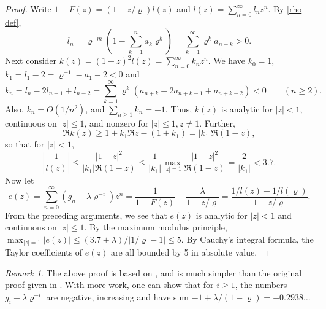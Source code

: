 \documentclass[11pt]{amsart}
\theoremstyle{remark}
\newtheorem{remark}{Remark}
\theoremstyle{plain}
\numberwithin{equation}{section}
\newcommand{\lam}{\ensuremath{\lambda}}
\renewcommand{\(}{\left(}
\renewcommand{\)}{\right)}
\renewcommand{\le}{\leqslant}
\renewcommand{\ge}{\geqslant}
\renewcommand{\rho}{\varrho}
\begin{document}
\begin{proof}
Write $1-F(z)=(1-z/\rho) l(z)$ and $l(z)=\sum_{n=0}^\infty l_n z^n$.
By \eqref{rho def},
\[
l_n=\rho^{-m}\( 1 - \sum_{k=1}^n a_k \rho^k \) =\sum_{k=1}^\infty \rho^k a_{n+k} >0.
\]
Next consider
$k(z)=(1-z)^2 l(z) = \sum_{n=0}^\infty k_n z^n$.  We have $k_0=1$,
$k_1=l_1-2=\rho^{-1}-a_1-2<0$ and
$$
k_n=l_n-2l_{n-1}+l_{n-2} = \sum_{k=1}^\infty \rho^k \( a_{n+k}-2
 a_{n+k-1}+a_{n+k-2} \) < 0 \qquad (n\ge 2).
$$
Also, $k_n=O(1/n^2)$, and $\sum_{n\ge 1} k_n = -1$.  Thus, $k(z)$ is analytic for
$|z|<1$, continuous on $|z| \le 1$, and nonzero for $|z|\le 1, z\ne 1$.
 Further,
$$
\Re k(z) \ge 1 + k_1 \Re z - (1+k_1) = |k_1| \Re (1-z),
$$
so that for $|z|<1$,
$$
\left|\frac{1}{l(z)}\right| \le \frac{|1-z|^2}{|k_1| \Re (1-z)} \le 
\frac{1}{|k_1|} \max_{|z|=1} \frac{|1-z|^2}{\Re (1-z)} = \frac{2}{|k_1|} < 3.7.
$$
Now let 
$$
e(z) = \sum_{n=0}^\infty \( g_n - \lam \rho^{-i} \) z^n = \frac{1}{1-F(z)} - 
\frac{\lam}{1-z/\rho} = \frac{1/l(z)-1/l(\rho)}{1-z/\rho}.
$$
From the preceding arguments, we see that $e(z)$ is analytic for $|z|<1$ and
continuous on $|z|\le 1$.  By the maximum modulus principle,
$\max_{|z|=1}|e(z)| \le (3.7+\lam)/|1/\rho-1| \le 5$.  By Cauchy's integral formula,
 the Taylor coefficients of $e(z)$ are all
bounded by 5 in absolute value.
\end{proof}

\begin{remark}
The above proof is based on \cite{AMM}, and is much simpler than the original proof 
given in \cite{F98}.
With more work, one can show that
for $i\ge 1$, the numbers $g_i - \lam \rho^{-i}$ are negative, 
increasing and have sum $-1+\lam/(1-\rho)=-0.2938\ldots$
\end{remark}
\end{document}

